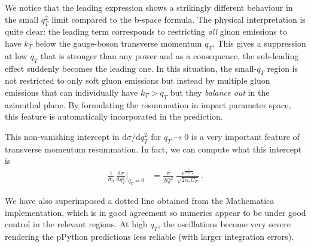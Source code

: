 \documentclass[11pt]{article}
\begin{document}
We notice that the leading expression shows a strikingly different behaviour in the small \(q_T^2\) limit compared to the b-space formula.
The physical interpretation is quite clear: the leading term corresponds to restricting \emph{all} gluon emissions to have \(k_T\) below the gauge-boson transverse momentum \(q_T\).
This gives a suppression at low \(q_T\) that is stronger than any power and as a consequence, the sub-leading effect suddenly becomes the leading one.
In this situation, the small-\(q_T\) region is not restricted to only soft gluon emissions but instead by multiple gluon emissions that can individually have \(k_T > q_T\) but they \emph{balance out} in the azimuthal plane.
By formulating the resummation in impact parameter space, this feature is automatically incorporated in the prediction.

This non-vanishing intercept in \(\mathrm{d}\sigma/\mathrm{d}q_T^2\) for \(q_T\to0\) is a very important feature of transverse momentum resummation.
In fact, we can compute what this intercept is
\begin{align}
  \frac{1}{\sigma_0}\,\frac{\mathrm{d}\sigma}{\mathrm{d}q_T^2} \biggr\rvert_{q_T=0}
  &=
  \frac{\pi}{2 Q^2}\;\frac{\mathrm{e}^{\frac{\pi}{2\alpha_s C_F}}}{\sqrt{2\alpha_s C_F}}
  \,.
\end{align}

We have also superimposed a dotted line obtained from the Mathematica implementation, which is in good agreement so numerics appear to be under good control in the relevant regions.
At high \(q_T\), the oscillations become very severe rendering the pPython predictions less reliable (with larger integration errors).
\end{document}
